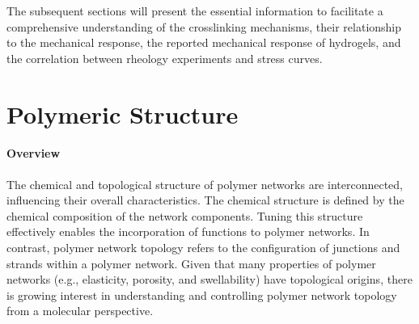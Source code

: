 The subsequent sections will present the essential information to facilitate a comprehensive understanding of the crosslinking mechanisms, their relationship to the mechanical response, the reported mechanical response of hydrogels, and the correlation between rheology experiments and stress curves.


\section{Polymeric Structure}

\paragraph{Overview} The chemical and topological structure of polymer networks are interconnected, influencing their overall characteristics.
The chemical structure is defined by the chemical composition of the network components. 
Tuning this structure effectively enables the incorporation of functions to polymer networks.
In contrast, polymer network topology refers to the configuration of junctions and strands within a polymer network.
Given that many properties of polymer networks (e.g., elasticity, porosity, and swellability) have topological origins, there is growing interest in understanding and controlling polymer network topology from a molecular perspective\citep{guPolymerNetworksPlastics2020}.

